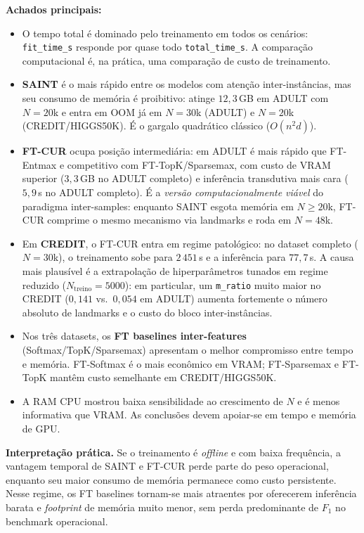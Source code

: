 \documentclass[12pt,a4paper]{article}
\begin{document}
\textbf{Achados principais:}
\begin{itemize}
  \item O tempo total é dominado pelo treinamento em todos os cenários:
        \texttt{fit\_time\_s} responde por quase todo \texttt{total\_time\_s}.
        A comparação computacional é, na prática, uma comparação de custo de
        treinamento.
  \item \textbf{SAINT} é o mais rápido entre os modelos com atenção
        inter-instâncias, mas seu consumo de memória é proibitivo: atinge
        $12{,}3$\,GB em ADULT com $N{=}20$k e entra em OOM já em $N{=}30$k
        (ADULT) e $N{=}20$k (CREDIT/HIGGS50K). É o gargalo quadrático
        clássico ($O(n^2 d)$).
  \item \textbf{FT-CUR} ocupa posição intermediária: em ADULT é mais rápido
        que FT-Entmax e competitivo com FT-TopK/Sparsemax, com custo de
        VRAM superior ($3{,}3$\,GB no ADULT completo) e inferência
        transdutiva mais cara ($5{,}9$\,s no ADULT completo). É a
        \emph{versão computacionalmente viável} do paradigma inter-samples:
        enquanto SAINT esgota memória em $N \geq 20$k, FT-CUR comprime o
        mesmo mecanismo via landmarks e roda em $N=48$k.
  \item Em \textbf{CREDIT}, o FT-CUR entra em regime patológico: no
        dataset completo ($N{=}30$k), o treinamento sobe para $2\,451$\,s
        e a inferência para $77{,}7$\,s. A causa mais plausível é a
        extrapolação de hiperparâmetros tunados em regime reduzido
        ($N_{\text{treino}}=5000$): em particular, um \texttt{m\_ratio}
        muito maior no CREDIT ($0{,}141$ vs.\ $0{,}054$ em ADULT) aumenta
        fortemente o número absoluto de landmarks e o custo do bloco
        inter-instâncias.
  \item Nos três datasets, os \textbf{FT baselines inter-features}
        (Softmax/TopK/Sparsemax) apresentam o melhor compromisso entre
        tempo e memória. FT-Softmax é o mais econômico em VRAM;
        FT-Sparsemax e FT-TopK mantêm custo semelhante em CREDIT/HIGGS50K.
  \item A RAM CPU mostrou baixa sensibilidade ao crescimento de $N$ e é
        menos informativa que VRAM. As conclusões devem apoiar-se em tempo
        e memória de GPU.
\end{itemize}

\textbf{Interpretação prática.} Se o treinamento é \emph{offline} e com
baixa frequência, a vantagem temporal de SAINT e FT-CUR perde parte do peso
operacional, enquanto seu maior consumo de memória permanece como custo
persistente. Nesse regime, os FT baselines tornam-se mais atraentes por
oferecerem inferência barata e \emph{footprint} de memória muito menor,
sem perda predominante de $F_1$ no benchmark operacional.
\end{document}
